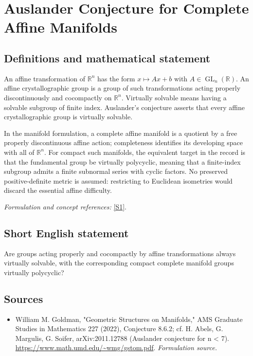 \documentclass[11pt]{article}
\begin{document}
\section*{\texorpdfstring{Auslander Conjecture for Complete Affine Manifolds}{Auslander Conjecture for Complete Affine Manifolds}}\label{30002369}
\subsection{Definitions and mathematical statement}
An affine transformation of ${\mathbb{R}}^n$ has the form $x\mapsto Ax+b$ with $A\in\operatorname{GL}_n({\mathbb{R}})$. An affine crystallographic group is a group of such transformations acting properly discontinuously and cocompactly on ${\mathbb{R}}^n$. Virtually solvable means having a solvable subgroup of finite index. Auslander's conjecture asserts that every affine crystallographic group is virtually solvable.

In the manifold formulation, a complete affine manifold is a quotient by a free properly discontinuous affine action; completeness identifies its developing space with all of ${\mathbb{R}}^n$. For compact such manifolds, the equivalent target in the record is that the fundamental group be virtually polycyclic, meaning that a finite-index subgroup admits a finite subnormal series with cyclic factors. No preserved positive-definite metric is assumed: restricting to Euclidean isometries would discard the essential affine difficulty.
\par\smallskip\textit{Formulation and concept references:} \href{https://www.math.umd.edu/~wmg/gstom.pdf}{[S1]}.

\subsection{Short English statement}
Are groups acting properly and cocompactly by affine transformations always virtually solvable, with the corresponding compact complete manifold groups virtually polycyclic?
\subsection{Sources}
\begin{itemize}
\item[S1]William M. Goldman, "Geometric Structures on Manifolds," AMS Graduate Studies in Mathematics 227 (2022), Conjecture 8.6.2; cf. H. Abels, G. Margulis, G. Soifer, arXiv:2011.12788 (Auslander conjecture for n < 7).
\url{https://www.math.umd.edu/~wmg/gstom.pdf}.
\textit{Formulation source.}
\end{itemize}
\end{document}

